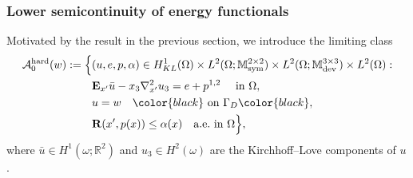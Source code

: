 \documentclass[reqno,10pt]{amsart}
\numberwithin{equation}{section}
\theoremstyle{remark}
\newcommand{\BLACK}{\color{black}}
\newcommand{\PINK}{\color{black}}
\newcommand{\calA}{\mathcal{A}}
\newcommand{\M}{\mathbb{M}}
\newcommand{\R}{\mathbb{R}}
\DeclareMathOperator{\dev}{dev}
\DeclareMathOperator{\sym}{sym}
\newcommand{\Dir}{D}
\newcommand{\E}{{\bf E}}
\newcommand{\D}{\nabla}
\newcommand{\disspot}{\mathbf{R}}
\begin{document}
\subsubsection{Lower semicontinuity of energy functionals}
Motivated by the result in the previous section, we introduce the limiting class
\begin{align*}
	\calA_{0}^{\rm hard}(w) := \Big\{ 
	& (u, e, p, \alpha) \in H^1_{KL}(\Omega) \times L^2(\Omega;\M^{2 \times 2}_{\sym}) \times L^2(\Omega;\M^{3 \times 3}_{\dev}) \times L^2(\Omega) :
	\\& {\E}_{x'}\bar{u} - x_3 {\D}^2_{x'}u_3 = e + p^{1,2} \quad \text{ in } \Omega,
	\\& u = w \quad {\PINK\text{ on } \Gamma_\Dir\BLACK},
	\\& \disspot(x', p(x)) \leq \alpha(x) \quad \text{a.e.} \text{ in } \Omega 
	\Big\},
\end{align*}
where $\bar{u} \in H^1(\omega;\R^2)$ and $u_3 \in H^2(\omega)$ are the Kirchhoff--Love components of $u$.
\end{document}
